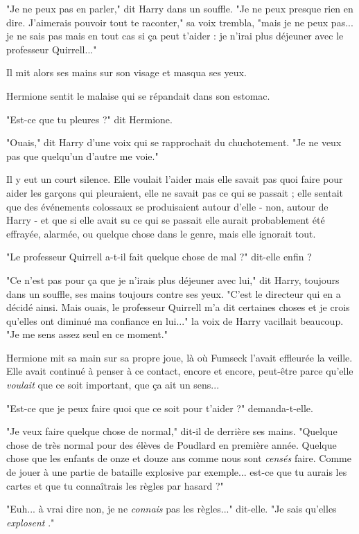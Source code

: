 "Je ne peux pas en parler," dit Harry dans un souffle. "Je ne peux presque rien en dire. J'aimerais pouvoir tout te raconter," sa voix trembla, "mais je ne peux pas... je ne sais pas mais en tout cas si ça peut t'aider : je n'irai plus déjeuner avec le professeur Quirrell..."

Il mit alors ses mains sur son visage et masqua ses yeux.

Hermione sentit le malaise qui se répandait dans son estomac.

"Est-ce que tu pleures ?" dit Hermione.

"Ouais," dit Harry d'une voix qui se rapprochait du chuchotement. "Je ne veux pas que quelqu'un d'autre me voie."

Il y eut un court silence. Elle voulait l'aider mais elle savait pas quoi faire pour aider les garçons qui pleuraient, elle ne savait pas ce qui se passait ; elle sentait que des événements colossaux se produisaient autour d'elle - non, autour de Harry - et que si elle avait su ce qui se passait elle aurait probablement été effrayée, alarmée, ou quelque chose dans le genre, mais elle ignorait tout.

"Le professeur Quirrell a-t-il fait quelque chose de mal ?" dit-elle enfin ?

"Ce n'est pas pour ça que je n'irais plus déjeuner avec lui," dit Harry, toujours dans un souffle, ses mains toujours contre ses yeux. "C'est le directeur qui en a décidé ainsi. Mais ouais, le professeur Quirrell m'a dit certaines choses et je crois qu'elles ont diminué ma confiance en lui..." la voix de Harry vacillait beaucoup. "Je me sens assez seul en ce moment."

Hermione mit sa main sur sa propre joue, là où Fumseck l'avait effleurée la veille. Elle avait continué à penser à ce contact, encore et encore, peut-être parce qu'elle \emph{voulait}  que ce soit important, que ça ait un sens...

"Est-ce que je peux faire quoi que ce soit pour t'aider ?" demanda-t-elle.

"Je veux faire quelque chose de normal," dit-il de derrière ses mains. "Quelque chose de très normal pour des élèves de Poudlard en première année. Quelque chose que les enfants de onze et douze ans comme nous sont \emph{censés}  faire. Comme de jouer à une partie de bataille explosive par exemple... est-ce que tu aurais les cartes et que tu connaîtrais les règles par hasard ?"

"Euh... à vrai dire non, je ne \emph{connais } pas les règles..." dit-elle. "Je sais qu'elles \emph{explosent} ."

